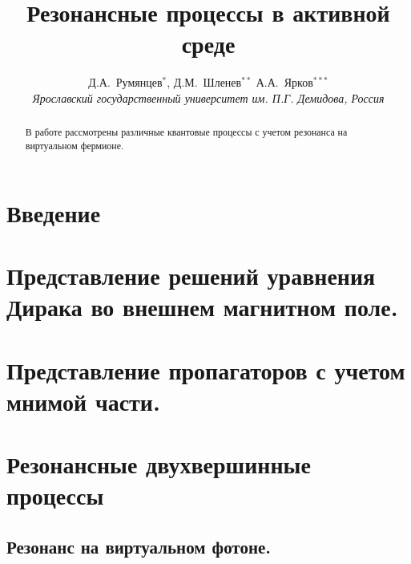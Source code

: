 \documentclass[12pt]{article}
\title{Резонансные процессы в активной среде}
\author{Д.А.~Румянцев$^{*}$, Д.М.~Шленев$^{**}$
А.А.~Ярков$^{***}$
\\
{\it Ярославский государственный университет им. П.Г. Демидова, Россия}}
\date{}
\begin{document}
\large
\maketitle
\def\abstractname{\empty}
\baselineskip=22pt

\begin{abstract}

\baselineskip=20pt

{\large В работе рассмотрены различные квантовые процессы с учетом резонанса на виртуальном фермионе.}
\end{abstract}

{\def\thefootnote{*}
\def\thefootnote{**}
\def\thefootnote{***}
}

\newpage
\unitlength 1mm


\section{Введение}



\section{Представление решений уравнения Дирака во внешнем магнитном поле.}


\section{Представление пропагаторов с учетом мнимой части.}


\section{Резонансные двухвершинные процессы}



\subsection{Резонанс на виртуальном фотоне.}

\end{document}
